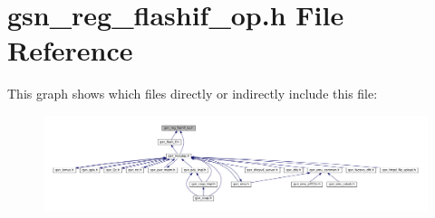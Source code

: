 \hypertarget{a00551}{
\section{gsn\_\-reg\_\-flashif\_\-op.h File Reference}
\label{a00551}
}
This graph shows which files directly or indirectly include this file:
\nopagebreak
\begin{figure}[H]
\begin{center}
\leavevmode
\includegraphics[width=400pt]{a00787}
\end{center}
\end{figure}
